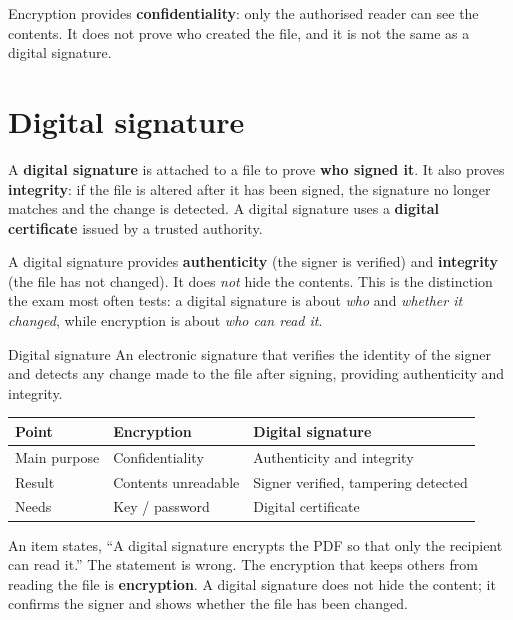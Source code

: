 Encryption provides \textbf{confidentiality}: only the authorised reader can
see the contents. It does not prove who created the file, and it is not the
same as a digital signature.

\section{Digital signature}
A \textbf{digital signature} is attached to a file to prove \textbf{who
signed it}. It also proves \textbf{integrity}: if the file is altered after
it has been signed, the signature no longer matches and the change is
detected. A digital signature uses a \textbf{digital certificate} issued by a
trusted authority.

A digital signature provides \textbf{authenticity} (the signer is verified)
and \textbf{integrity} (the file has not changed). It does \emph{not} hide
the contents. This is the distinction the exam most often tests: a digital
signature is about \emph{who} and \emph{whether it changed}, while encryption
is about \emph{who can read it}.

\begin{definitionbox}{Digital signature}
An electronic signature that verifies the identity of the signer and detects
any change made to the file after signing, providing authenticity and
integrity.
\end{definitionbox}

\begin{center}
\begin{tabular}{lll}
\toprule
\textbf{Point} & \textbf{Encryption} & \textbf{Digital signature} \\
\midrule
Main purpose & Confidentiality & Authenticity and integrity \\
Result & Contents unreadable & Signer verified, tampering detected \\
Needs & Key / password & Digital certificate \\
\bottomrule
\end{tabular}
\end{center}

\begin{example}
An item states, ``A digital signature encrypts the PDF so that only the
recipient can read it.'' The statement is wrong. The encryption that keeps
others from reading the file is \textbf{encryption}. A digital signature does
not hide the content; it confirms the signer and shows whether the file has
been changed.
\end{example}

